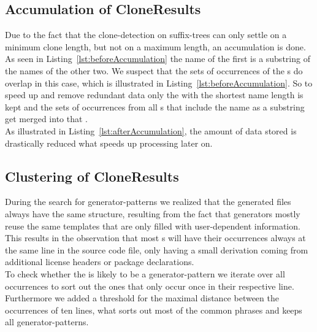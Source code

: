 \subsection{Accumulation of CloneResults}
\label{section:accumulation}
Due to the fact that the clone-detection on suffix-trees can only settle on a minimum clone length, but not on a maximum length, an accumulation is done.\\
As seen in Listing~\ref{lst:beforeAccumulation} the name of the first  is a substring of the names of the other two. We suspect that the sets of occurrences of the s do overlap in this case, which is illustrated in Listing~\ref{lst:beforeAccumulation}. So to speed up and remove redundant data only the  with the shortest name length is kept and the sets of occurrences from all s that include the name as a substring get merged into that .\\
As illustrated in Listing~\ref{lst:afterAccumulation}, the amount of data stored is drastically reduced what speeds up processing later on.



\subsection{Clustering of CloneResults}
\label{section:clustering}
During the search for generator-patterns we realized that the generated files always have the same structure, resulting from the fact that generators mostly reuse the same templates that are only filled with user-dependent information.\\
This results in the observation that most s will have their occurrences always at the same line in the source code file, only having a small derivation coming from additional license headers or package declarations.\\
To check whether the  is likely to be a generator-pattern we iterate over all occurrences to sort out the ones that only occur once in their respective line. Furthermore we added a threshold for the maximal distance between the occurrences of ten lines, what sorts out most of the common phrases and keeps all generator-patterns.

